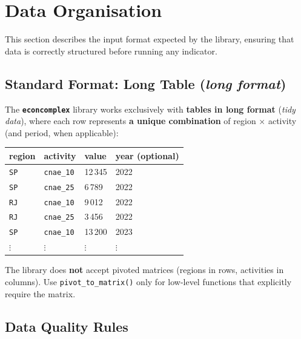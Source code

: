 \documentclass[12pt, a4paper]{article}
\newcommand{\pkg}[1]{\texttt{\textbf{#1}}}
\newcommand{\fn}[1]{\texttt{#1}}
\begin{document}
\section{Data Organisation}

This section describes the input format expected by the library,
ensuring that data is correctly structured before running any indicator.

\subsection{Standard Format: Long Table (\textit{long format})}

The \pkg{econcomplex} library works exclusively with
\textbf{tables in long format} (\textit{tidy data}),
where each row represents \textbf{a unique combination} of
region $\times$ activity (and period, when applicable):

\begin{center}
\renewcommand{\arraystretch}{1.3}
\begin{tabular}{llll}
\toprule
\textbf{region} & \textbf{activity} & \textbf{value} & \textbf{year (optional)} \\
\midrule
\texttt{SP}  & \texttt{cnae\_10} & 12\,345 & 2022 \\
\texttt{SP}  & \texttt{cnae\_25} &  6\,789 & 2022 \\
\texttt{RJ}  & \texttt{cnae\_10} &  9\,012 & 2022 \\
\texttt{RJ}  & \texttt{cnae\_25} &  3\,456 & 2022 \\
\texttt{SP}  & \texttt{cnae\_10} & 13\,200 & 2023 \\
$\vdots$ & $\vdots$ & $\vdots$ & $\vdots$ \\
\bottomrule
\end{tabular}
\end{center}

\begin{warnbox}
  The library does \textbf{not} accept pivoted matrices (regions in rows,
  activities in columns). Use \fn{pivot\_to\_matrix()} only for
  low-level functions that explicitly require the matrix.
\end{warnbox}

\subsection{Data Quality Rules}
\end{document}
